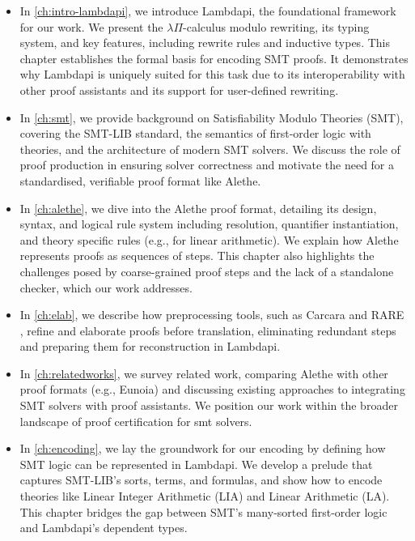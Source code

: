\begin{itemize}
\item In \cref{ch:intro-lambdapi}, we introduce Lambdapi, the foundational framework for our work.
    We present the $\lambda\Pi$-calculus modulo rewriting, its typing system, and key features, including rewrite rules and inductive types.
    This chapter establishes the formal basis for encoding SMT proofs.
    It demonstrates why Lambdapi is uniquely suited for this task due to its interoperability with other proof assistants and its support for user-defined rewriting.

\item In \cref{ch:smt}, we provide background on Satisfiability Modulo Theories (SMT), covering the SMT-LIB standard, the semantics of first-order logic with theories, and the architecture of modern SMT solvers.
We discuss the role of proof production in ensuring solver correctness and motivate the need for a standardised, verifiable proof format like Alethe.

\item In \cref{ch:alethe}, we dive into the Alethe proof format, detailing its design, syntax, and logical rule system including resolution, quantifier instantiation, and theory specific rules (e.g., for linear arithmetic).
We explain how Alethe represents proofs as sequences of steps.
This chapter also highlights the challenges posed by coarse-grained proof steps and the lack of a standalone checker, which our work addresses.

\item In \cref{ch:elab}, we describe how preprocessing tools, such as Carcara \cite{carcara} and RARE \cite{rare}, refine and elaborate proofs before translation, eliminating redundant steps and preparing them for reconstruction in Lambdapi.

\item In \cref{ch:relatedworks}, we survey related work, comparing Alethe with other proof formats (e.g., Eunoia) and discussing existing approaches to integrating SMT solvers with proof assistants.
    We position our work within the broader landscape of proof certification for smt solvers.

\item In \cref{ch:encoding}, we lay the groundwork for our encoding by defining how SMT logic can be represented in Lambdapi.
    We develop a prelude that captures SMT-LIB's sorts, terms, and formulas, and show how to encode theories like Linear Integer Arithmetic (LIA) and Linear Arithmetic (LA).
    This chapter bridges the gap between SMT's many-sorted first-order logic and Lambdapi's dependent types.


\end{itemize}
